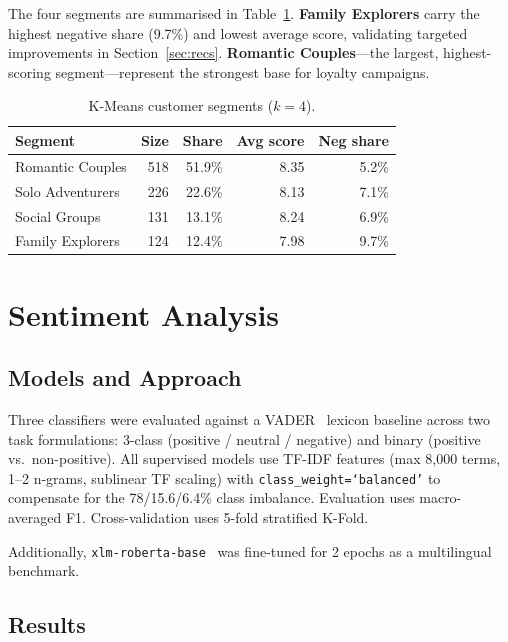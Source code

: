 \documentclass[runningheads]{llncs}
\begin{document}
The four segments are summarised in Table~\ref{tab:segments}.
\textbf{Family Explorers} carry the highest negative share (9.7\%) and
lowest average score, validating targeted improvements in
Section~\ref{sec:recs}. \textbf{Romantic Couples}---the largest,
highest-scoring segment---represent the strongest base for loyalty
campaigns.

\begin{table}[t]
\caption{K-Means customer segments ($k=4$).}
\label{tab:segments}
\centering
\begin{tabular}{lrrrr}
\toprule
Segment            & Size & Share & Avg score & Neg share \\
\midrule
Romantic Couples   & 518  & 51.9\% & 8.35 & 5.2\% \\
Solo Adventurers   & 226  & 22.6\% & 8.13 & 7.1\% \\
Social Groups      & 131  & 13.1\% & 8.24 & 6.9\% \\
Family Explorers   & 124  & 12.4\% & 7.98 & 9.7\% \\
\bottomrule
\end{tabular}
\end{table}

\section{Sentiment Analysis}

\subsection{Models and Approach}

Three classifiers were evaluated against a VADER~\cite{vader2014}
lexicon baseline across two task formulations: 3-class (positive /
neutral / negative) and binary (positive vs.\ non-positive). All
supervised models use TF-IDF features (max 8,000 terms, 1--2 n-grams,
sublinear TF scaling) with \texttt{class\_weight=`balanced'} to
compensate for the 78/15.6/6.4\% class imbalance. Evaluation uses
macro-averaged F1. Cross-validation uses 5-fold stratified K-Fold.

Additionally, \texttt{xlm-roberta-base}~\cite{xlmroberta2020} was
fine-tuned for 2 epochs as a multilingual benchmark.

\subsection{Results}
\end{document}
